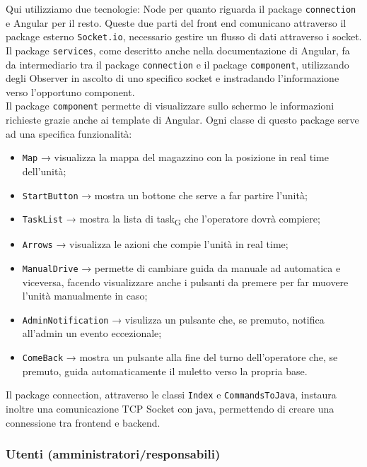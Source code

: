 Qui utilizziamo due tecnologie: Node per quanto riguarda il package \texttt{connection} e Angular per il resto. Queste due parti del front end comunicano attraverso il package esterno \texttt{Socket.io}, necessario gestire un flusso di dati attraverso i socket.\\
Il package \texttt{services}, come descritto anche nella documentazione di Angular, fa da intermediario tra il package \texttt{connection} e il package \texttt{component}, utilizzando degli Observer in ascolto di uno specifico socket e instradando l'informazione verso l'opportuno component.\\
Il package \texttt{component} permette di visualizzare sullo schermo le informazioni richieste grazie anche ai template di Angular. Ogni classe di questo package serve ad una specifica funzionalità:
\begin{itemize}
	\item \texttt{Map} → visualizza la mappa del magazzino con la posizione in real time dell'unità;
	\item \texttt{StartButton} → mostra un bottone che serve a far partire l'unità;
	\item \texttt{TaskList} → mostra la lista di task\textsubscript{G} che l'operatore dovrà compiere;
	\item \texttt{Arrows} → visualizza le azioni che compie l'unità in real time;
	\item \texttt{ManualDrive} → permette di cambiare guida da manuale ad automatica e viceversa, facendo visualizzare anche i pulsanti da premere per far muovere l'unità manualmente in caso;
	\item \texttt{AdminNotification} → visulizza un pulsante che, se premuto, notifica all'admin un evento eccezionale;
	\item \texttt{ComeBack} → mostra un pulsante alla fine del turno dell'operatore che, se premuto, guida automaticamente il muletto verso la propria base.
\end{itemize}
Il package connection, attraverso le classi \texttt{Index} e \texttt{CommandsToJava}, instaura inoltre una comunicazione TCP Socket con java, permettendo di creare una connessione tra frontend e backend.\\

\subsubsection{Utenti (amministratori/responsabili)}

